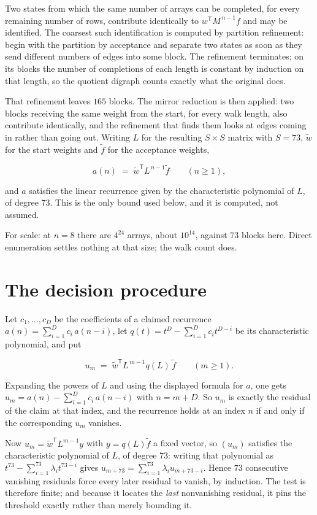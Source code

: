 \documentclass[11pt]{article}
\theoremstyle{definition}
\begin{document}
Two states from which the same number of arrays can be completed, for every remaining number of rows, contribute identically to $w^{\mathsf T}M^{\,n-1}f$ and may be identified. The coarsest such identification is computed by partition refinement: begin with the partition by acceptance and separate two states as soon as they send different numbers of edges into some block. The refinement terminates; on its blocks the number of completions of each length is constant by induction on that length, so the quotient digraph counts exactly what the original does.

That refinement leaves $165$ blocks. The mirror reduction is then applied: two blocks receiving the same weight from the start, for every walk length, also contribute identically, and the refinement that finds them looks at edges coming in rather than going out. Writing $L$ for the resulting $S \times S$ matrix with $S = 73$, $\tilde w$ for the start weights and $\tilde f$ for the acceptance weights,

\[a(n) \;=\; \tilde w^{\mathsf T} L^{\,n-1} \tilde f \qquad (n \ge 1),\]

and $a$ satisfies the linear recurrence given by the characteristic polynomial of $L$, of degree $73$. This is the only bound used below, and it is computed, not assumed.

For scale: at $n = 8$ there are $4^{24}$ arrays, about $10^{14}$, against $73$ blocks here. Direct enumeration settles nothing at that size; the walk count does.

\section{The decision procedure}

Let $c_1,\dots,c_D$ be the coefficients of a claimed recurrence $a(n) = \sum_{i=1}^{D} c_i\,a(n-i)$, let $q(t) = t^{D} - \sum_{i=1}^{D} c_i t^{D-i}$ be its characteristic polynomial, and put

\[u_m \;=\; \tilde w^{\mathsf T} L^{\,m-1} q(L)\,\tilde f \qquad (m \ge 1).\]

Expanding the powers of $L$ and using the displayed formula for $a$, one gets $u_m = a(n) - \sum_{i=1}^{D} c_i\,a(n-i)$ with $n = m + D$. So $u_m$ is exactly the residual of the claim at that index, and the recurrence holds at an index $n$ if and only if the corresponding $u_m$ vanishes.

Now $u_m = \tilde w^{\mathsf T} L^{m-1} y$ with $y = q(L)\tilde f$ a fixed vector, so $(u_m)$ satisfies the characteristic polynomial of $L$, of degree $73$: writing that polynomial as $t^{73} - \sum_{i=1}^{73} \lambda_i t^{73-i}$ gives $u_{m+73} = \sum_{i=1}^{73} \lambda_i u_{m+73-i}$. Hence $73$ consecutive vanishing residuals force every later residual to vanish, by induction. The test is therefore finite; and because it locates the {\itshape last} nonvanishing residual, it pins the threshold exactly rather than merely bounding it.
\end{document}
